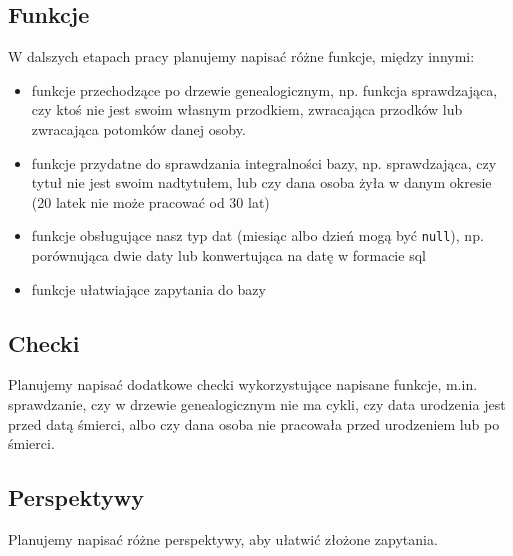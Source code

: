 \documentclass{article}
\begin{document}
\subsection{Funkcje}
W dalszych etapach pracy planujemy napisać różne funkcje, między innymi:
\begin{itemize}
\item funkcje przechodzące po drzewie genealogicznym, np. funkcja sprawdzająca, czy ktoś nie jest swoim własnym przodkiem, zwracająca przodków lub zwracająca potomków danej osoby.
\item funkcje przydatne do sprawdzania integralności bazy, np. sprawdzająca, czy tytuł nie jest swoim nadtytułem, lub czy dana osoba żyła w danym okresie (20 latek nie może pracować od 30 lat)
\item funkcje obsługujące nasz typ dat (miesiąc albo dzień mogą być \texttt{null}), np. porównująca dwie daty lub konwertująca na datę w formacie sql
\item funkcje ułatwiające zapytania do bazy
\end{itemize}

\subsection{Checki}

Planujemy napisać dodatkowe checki wykorzystujące napisane funkcje, m.in. sprawdzanie, czy w drzewie genealogicznym nie ma cykli, czy data urodzenia jest przed datą śmierci, albo czy dana osoba nie pracowała przed urodzeniem lub po śmierci.

\subsection{Perspektywy}

Planujemy napisać różne perspektywy, aby ułatwić złożone zapytania.
\end{document}
